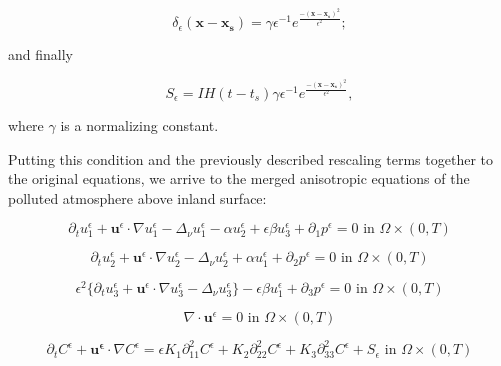 \documentclass[11pt]{article}
\begin{document}
\[\delta_\epsilon (\mathbf{x}-\mathbf{x_s}) = \gamma \epsilon^{-1} e ^ {\frac{-(\mathbf{x}-\mathbf{x_s})^2}{\epsilon^2}};\]

and finally

\begin{equation}
S_\epsilon = I H(t-t_s) \gamma \epsilon^{-1} e ^ {\frac{-(\mathbf{x}-\mathbf{x_s})^2}{\epsilon^2}},
\end{equation}

where $\gamma$ is a normalizing constant.
    
    Putting this condition and the previously described rescaling terms together to the original equations, we arrive to the merged anisotropic equations of the polluted atmosphere above inland surface:
  
    \begin{equation} \label{ANSC1}
    \partial_t u^\epsilon _1 + \mathbf{u}^\epsilon \cdot \nabla u^\epsilon _1 -\Delta_\nu u^\epsilon _1 -\alpha u_2^\epsilon + \epsilon \beta u_3^\epsilon + \partial_1 p^\epsilon = 0 \text{ in } \Omega \times (0,T)
    \end{equation}
    
    \begin{equation} \label{ANSC2}
    \partial_t u_2^\epsilon + \mathbf{u}^\epsilon \cdot \nabla u_2^\epsilon -\Delta_\nu u_2^\epsilon + \alpha u_1^\epsilon + \partial_2 p^\epsilon = 0 \text{ in } \Omega \times (0,T)
    \end{equation}
    
    \begin{equation} \label{ANSC3}
    \epsilon^2 \{  \partial_t u_3^\epsilon + \mathbf{u}^\epsilon \cdot \nabla u_3^\epsilon -\Delta_\nu u_3^{\epsilon} \} - \epsilon \beta u_1^\epsilon + \partial_3 p^\epsilon = 0 \text{ in } \Omega \times (0,T)
    \end{equation}
    
    \begin{equation} \label{ANSC4}
    \nabla \cdot \mathbf{u}^\epsilon= 0 \text{ in } \Omega \times (0,T)
    \end{equation}
    
    \begin{equation} \label{ANSC5}
    \partial_t C^\epsilon + \mathbf{u^\epsilon} \cdot \nabla C^\epsilon = \epsilon K_1 \partial_{11} ^ 2 C^\epsilon + K_2 \partial_{22} ^ 2 C^\epsilon + K_3 \partial_{33} ^ 2 C^\epsilon + S_\epsilon \text{ in } \Omega \times (0,T)
    \end{equation}
    
\end{document}
